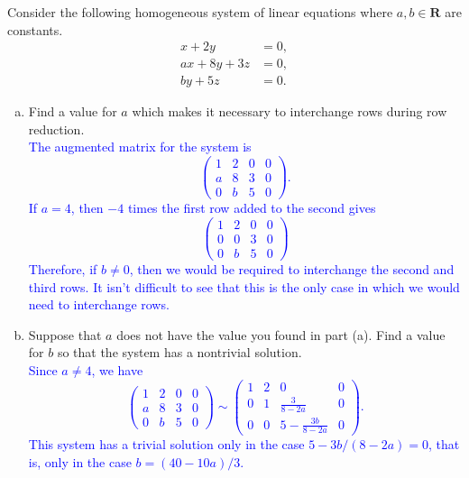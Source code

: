 \documentclass[a4paper,11pt]{article}
\newcommand{\R}{\mathbf{R}}
\newcommand{\BB}[1]{\textcolor{blue}{#1}}
\begin{document}
 Consider the following homogeneous system of
linear equations where $a,b \in \R$ are constants.
\begin{align*}
  x+2y &= 0, \\
  ax+8y+3z &= 0, \\
  by+5z &= 0.
\end{align*}
\begin{enumerate}[(a)]
\item Find a value for $a$ which makes it necessary to interchange rows during
  row reduction. \\

  \BB{The augmented matrix for the system is
    \[
      \left(
        \begin{array}{rrr|r}
          1 & 2 & 0 & 0 \\
          a & 8 & 3 & 0 \\
          0 & b & 5 & 0
        \end{array}
      \right).
    \]
    If $a=4$, then $-4$ times the first row added to the second gives
    \[
      \left(
        \begin{array}{rrr|r}
          1 & 2 & 0 & 0 \\
          0 & 0 & 3 & 0 \\
          0 & b & 5 & 0
        \end{array}
      \right)
    \]
    Therefore, if $b \neq 0$, then we would be required to interchange the
    second and third rows. It isn't difficult to see that this is the only case
    in which we would need to interchange rows. \\
  }

\item Suppose that $a$ does not have the value you found in part (a). Find a
  value for $b$ so that the system has a nontrivial solution. \\

  \BB{Since $a \neq 4$, we have
    \[
      \left(
        \begin{array}{rrr|r}
          1 & 2 & 0 & 0 \\
          a & 8 & 3 & 0 \\
          0 & b & 5 & 0
        \end{array}
      \right)\sim
      \left(
        \begin{array}{rrr|r}
          1 & 2 & 0 & 0 \\
          0 & 1 & \frac{3}{8-2a} & 0 \\
          0 & 0 & 5-\frac{3b}{8-2a} & 0
        \end{array}
      \right).
    \]
    This system has a trivial solution only in the case $5-3b/(8-2a)=0$, that
    is, only in the case $b=(40-10a)/3$. \\
  }
  

\end{enumerate}
\end{document}

